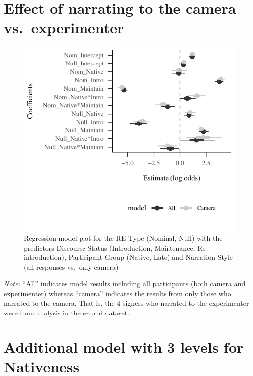\documentclass[]{elsarticle} %
\begin{document}
\clearpage

\onecolumn

\hypertarget{effect-of-narrating-to-the-camera-vs.-experimenter}{%
\section{Effect of narrating to the camera
vs.~experimenter}\label{effect-of-narrating-to-the-camera-vs.-experimenter}}

\label{section:c}

\begin{figure}
\centering
\includegraphics{revised_manuscript_files/figure-latex/model-camera-1.pdf}
\caption{Regression model plot for the RE Type (Nominal, Null) with the
predictors Discourse Status (Introduction, Maintenance,
Re-introduction), Participant Group (Native, Late) and Narration Style
(all responses vs.~only camera)}
\end{figure}

\emph{Note:} ``All'' indicates model results including all participants
(both camera and experimenter) whereas ``camera'' indicates the results
from only those who narrated to the camera. That is, the 4 signers who
narrated to the experimenter were from analysis in the second dataset.

\clearpage

\hypertarget{additional-model-with-3-levels-for-nativeness}{%
\section{Additional model with 3 levels for
Nativeness}\label{additional-model-with-3-levels-for-nativeness}}
\end{document}
